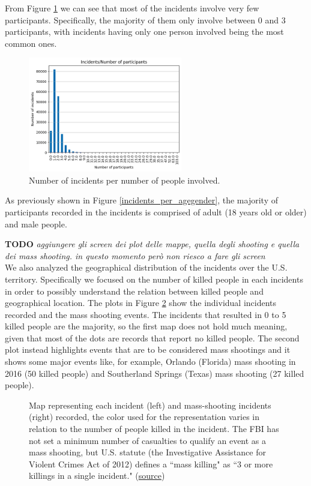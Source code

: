 \documentclass[10pt,a4paper]{report}
\begin{document}
From Figure \ref{incidents_per_nparticipants} we can see that most of the incidents involve very few participants.
Specifically, the majority of them only involve between 0 and 3 participants, with incidents having only one person involved being the most common ones.

\begin{figure}[h]
	\includegraphics[width=0.6\textwidth]{incidents_per_nparticipants}
	\centering
	\caption{Number of incidents per number of people involved.}
	\label{incidents_per_nparticipants}
\end{figure}

As previously shown in Figure \ref{incidents_per_agegender}, the majority of participants recorded in the incidents is comprised of adult (18 years old or older) and male people.

\textbf{TODO} \textit{aggiungere gli screen dei plot delle mappe, quella degli shooting e quella dei mass shooting. in questo momento però non riesco a fare gli screen}\\
We also analyzed the geographical distribution of the incidents over the U.S. territory.
Specifically we focused on the number of killed people in each incidents in order to possibly understand the relation between killed people and geographical location.
The plots in Figure \ref{map_du} show the individual incidents recorded and the mass shooting events.
The incidents that resulted in 0 to 5 killed people are the majority, so the first map does not hold much meaning, given that most of the dots are records that report no killed people.
The second plot instead highlights events that are to be considered mass shootings and it shows some major events like, for example, Orlando (Florida) mass shooting in 2016 (50 killed people) and Southerland Springs (Texas) mass shooting (27 killed people).

\begin{figure}[h]
	\centering
	\caption{Map representing each incident (left) and mass-shooting incidents (right) recorded, the color used for the representation varies in relation to the number of people killed in the incident.
	The FBI has not set a minimum number of casualties to qualify an event as a mass shooting, but U.S. statute (the Investigative Assistance for Violent Crimes Act of 2012) defines a ``mass killing" as ``3 or more killings in a single incident." (\href{https://www.britannica.com/topic/mass-shooting}{source})}
	\label{map_du}
\end{figure}
\end{document}
